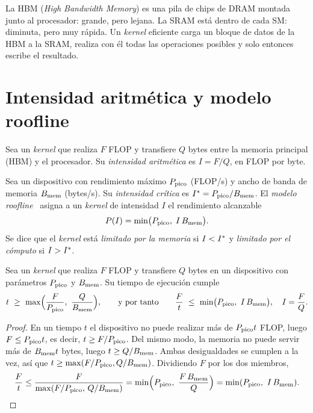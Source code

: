 La HBM (\emph{High Bandwidth Memory}) es una pila de chips de DRAM montada junto al procesador: grande, pero lejana. La SRAM está dentro de cada SM: diminuta, pero muy rápida. Un \emph{kernel} eficiente carga un bloque de datos de la HBM a la SRAM, realiza con él todas las operaciones posibles y solo entonces escribe el resultado.

\section{Intensidad aritmética y modelo roofline}

\begin{definicion}
Sea un \emph{kernel} que realiza $F$ FLOP y transfiere $Q$ bytes entre la memoria principal (HBM) y el procesador. Su \emph{intensidad aritmética} es $I=F/Q$, en FLOP por byte.
\end{definicion}

\begin{definicion}
Sea un dispositivo con rendimiento máximo $P_{\mathrm{pico}}$ (FLOP/s) y ancho de banda de memoria $B_{\mathrm{mem}}$ (bytes/s). Su \emph{intensidad crítica} es $I^{\ast}=P_{\mathrm{pico}}/B_{\mathrm{mem}}$. El \emph{modelo roofline}~\cite{roofline} asigna a un \emph{kernel} de intensidad $I$ el rendimiento alcanzable
\[
P(I)=\min\bigl(P_{\mathrm{pico}},\;I\,B_{\mathrm{mem}}\bigr).
\]
Se dice que el \emph{kernel} está \emph{limitado por la memoria} si $I<I^{\ast}$ y \emph{limitado por el cómputo} si $I>I^{\ast}$.
\end{definicion}

\begin{teorema}\label{teo:roofline}
Sea un \emph{kernel} que realiza $F$ FLOP y transfiere $Q$ bytes en un dispositivo con parámetros $P_{\mathrm{pico}}$ y $B_{\mathrm{mem}}$. Su tiempo de ejecución cumple
\[
t\ \ge\ \max\Bigl(\frac{F}{\Ppico},\ \frac{Q}{\Bmem}\Bigr),
\qquad\text{y por tanto}\qquad
\frac{F}{t}\ \le\ \min\bigl(\Ppico,\ I\,\Bmem\bigr),\quad I=\frac{F}{Q}.
\]
\end{teorema}

\begin{proof}
En un tiempo $t$ el dispositivo no puede realizar más de $P_{\mathrm{pico}} t$ FLOP, luego $F\le P_{\mathrm{pico}} t$, es decir, $t\ge F/P_{\mathrm{pico}}$. Del mismo modo, la memoria no puede servir más de $B_{\mathrm{mem}} t$ bytes, luego $t\ge Q/B_{\mathrm{mem}}$. Ambas desigualdades se cumplen a la vez, así que $t\ge\max(F/P_{\mathrm{pico}},Q/B_{\mathrm{mem}})$. Dividiendo $F$ por los dos miembros,
\[
\frac{F}{t}\le\frac{F}{\max(F/\Ppico,\,Q/\Bmem)}=\min\Bigl(\Ppico,\ \frac{F\,\Bmem}{Q}\Bigr)=\min(\Ppico,\ I\,\Bmem).\qedhere
\]
\end{proof}

